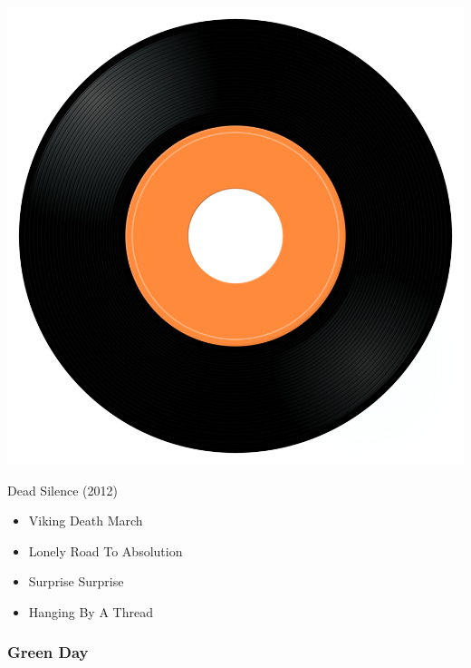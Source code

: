 \begin{minipage}[t]{0.25\textwidth}
\captionsetup{type=figure}
\includegraphics[width=\textwidth]{Images/cover.png}
\caption*{Dead Silence (2012)}
\end{minipage}
\begin{minipage}[t]{0.25\textwidth}\vspace{0pt}
\begin{itemize}[nosep,leftmargin=1em,labelwidth=*,align=left]
	\setlength{\itemsep}{0pt}
	\item Viking Death March
	\item Lonely Road To Absolution
	\item Surprise Surprise
	\item Hanging By A Thread
\end{itemize}
\end{minipage}

\subsubsection{Green Day}

